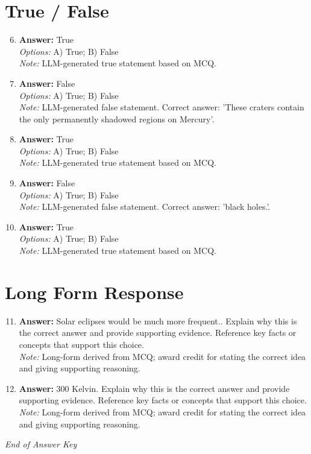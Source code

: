 \documentclass[12pt]{article}
\begin{document}
\section*{True / False}
\begin{enumerate}[label=\arabic*.]
\setcounter{enumi}{5}
\item \textbf{Answer:} True
\\ \textit{Options:} A) True; B) False
\\ \textit{Note:} LLM-generated true statement based on MCQ.
\item \textbf{Answer:} False
\\ \textit{Options:} A) True; B) False
\\ \textit{Note:} LLM-generated false statement. Correct answer: 'These craters contain the only permanently shadowed regions on Mercury'.
\item \textbf{Answer:} True
\\ \textit{Options:} A) True; B) False
\\ \textit{Note:} LLM-generated true statement based on MCQ.
\item \textbf{Answer:} False
\\ \textit{Options:} A) True; B) False
\\ \textit{Note:} LLM-generated false statement. Correct answer: 'black holes.'.
\item \textbf{Answer:} True
\\ \textit{Options:} A) True; B) False
\\ \textit{Note:} LLM-generated true statement based on MCQ.
\end{enumerate}

\section*{Long Form Response}
\begin{enumerate}[label=\arabic*.]
\setcounter{enumi}{10}
\item \textbf{Answer:} Solar eclipses would be much more frequent.. Explain why this is the correct answer and provide supporting evidence. Reference key facts or concepts that support this choice.
\\ \textit{Note:} Long-form derived from MCQ; award credit for stating the correct idea and giving supporting reasoning.
\item \textbf{Answer:} 300 Kelvin. Explain why this is the correct answer and provide supporting evidence. Reference key facts or concepts that support this choice.
\\ \textit{Note:} Long-form derived from MCQ; award credit for stating the correct idea and giving supporting reasoning.
\end{enumerate}

\vfill
\noindent\textit{End of Answer Key}
\end{document}
